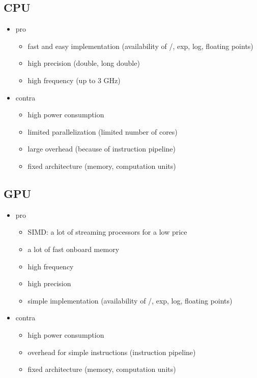 \documentclass[mscthesis]{usiinfthesis}
\begin{document}
\subsection{CPU}
\begin{itemize}
    \item pro
    \begin{itemize}
        \item fast and easy implementation (availability of /, exp, log,
            floating points)
        \item high precision (double, long double)
        \item high frequency (up to 3 GHz)
    \end{itemize}
    \item contra
    \begin{itemize}
        \item high power consumption
        \item limited parallelization (limited number of cores)
        \item large overhead (because of instruction pipeline)
        \item fixed architecture (memory, computation units)
    \end{itemize}
\end{itemize}

\subsection{GPU}
\begin{itemize}
    \item pro
    \begin{itemize}
        \item SIMD: a lot of streaming processors for a low price
        \item a lot of fast onboard memory
        \item high frequency
        \item high precision
        \item simple implementation (availability of /, exp, log,
            floating points)
    \end{itemize}
    \item contra
    \begin{itemize}
        \item high power consumption
        \item overhead for simple instructions (instruction pipeline)
        \item fixed architecture (memory, computation units)
    \end{itemize}
\end{itemize}
\end{document}
